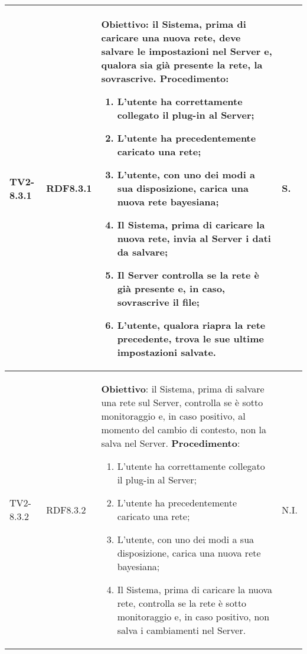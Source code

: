 \begin{longtable}{|C{.15\textwidth}|C{.13\textwidth}|m{.65\textwidth}|C{.08\textwidth}|}
TV2-8.3.1 & RDF8.3.1 &
	\textbf{Obiettivo}: il Sistema, prima di caricare una nuova rete, deve salvare le impostazioni nel Server e, qualora sia già presente la rete, la sovrascrive. \newline
	\textbf{Procedimento}:
	\begin{enumerate}
		\item L'utente ha correttamente collegato il plug-in al Server;
		\item L'utente ha precedentemente caricato una rete;
		\item L'utente, con uno dei modi a sua disposizione, carica una nuova rete bayesiana;
		\item Il Sistema, prima di caricare la nuova rete, invia al Server i dati da salvare;
		\item Il Server controlla se la rete è già presente e, in caso, sovrascrive il file;
		\item L'utente, qualora riapra la rete precedente, trova le sue ultime impostazioni salvate.
	\end{enumerate}
	& S. \\
\hline	

TV2-8.3.2 & RDF8.3.2 &
	\textbf{Obiettivo}: il Sistema, prima di salvare una rete sul Server, controlla se è sotto monitoraggio e, in caso positivo, al momento del cambio di contesto, non la salva nel Server. \newline
	\textbf{Procedimento}:
	\begin{enumerate}
		\item L'utente ha correttamente collegato il plug-in al Server;
		\item L'utente ha precedentemente caricato una rete;
		\item L'utente, con uno dei modi a sua disposizione, carica una nuova rete bayesiana;
		\item Il Sistema, prima di caricare la nuova rete, controlla se la rete è sotto monitoraggio e, in caso positivo, non salva i cambiamenti nel Server.
	\end{enumerate}
	& N.I. \\
\hline	


\end{longtable}
